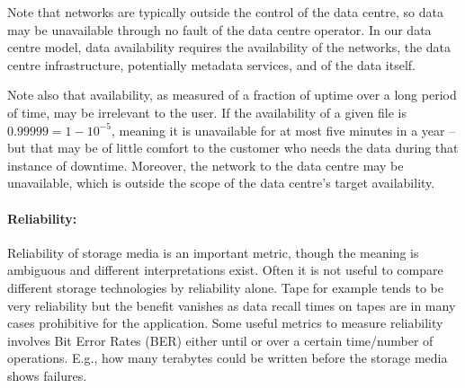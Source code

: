 Note that networks are typically outside the control of the data centre, so data may be unavailable through no fault of
the data centre operator.  In our data centre model, data availability requires the availability of the networks, the
data centre infrastructure, potentially metadata services, and of the data itself.

Note also that availability, as measured of a fraction of uptime over a long period of time, may be irrelevant to the
user.  If the availability of a given file is $0.99999=1-10^{-5}$, meaning it is unavailable for at most five minutes in
a year -- but that may be of little comfort to the customer who needs the data during that instance of downtime.
Moreover, the network to the data centre may be unavailable, which is outside the scope of the data centre's target
availability.


\paragraph{Reliability:}
Reliability of storage media is an important metric, though the meaning is ambiguous and different interpretations exist.
Often it is not useful to compare different storage technologies by reliability alone. Tape for example tends to be very reliability but the benefit vanishes as data recall times on tapes are in many cases prohibitive for the application.
Some useful metrics to measure reliability involves Bit Error Rates (BER) either until or over a certain time/number of operations.
E.g., how many terabytes could be written before the storage media shows failures.


